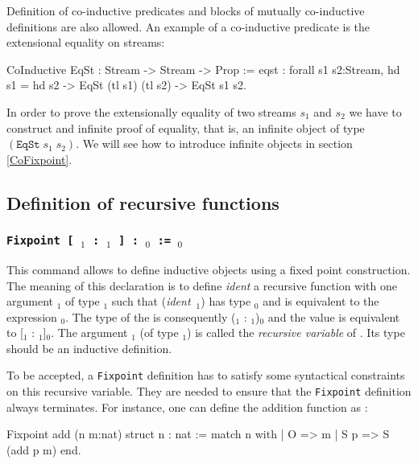 Definition of co-inductive predicates and blocks of mutually
co-inductive definitions are also allowed. An example of a
co-inductive predicate is the extensional equality on streams:

\begin{coq_example}
CoInductive EqSt : Stream -> Stream -> Prop :=
    eqst :
      forall s1 s2:Stream,
        hd s1 = hd s2 -> EqSt (tl s1) (tl s2) -> EqSt s1 s2.
\end{coq_example}

In order to prove the extensionally equality of two streams $s_1$ and
$s_2$ we have to construct and infinite proof of equality, that is,
an infinite object of type $(\texttt{EqSt}\;s_1\;s_2)$. We will see
how to introduce infinite objects in section \ref{CoFixpoint}.

\subsection{Definition of recursive functions}

\subsubsection{\tt Fixpoint {\ident} [ \ident$_1$ : \type$_1$ ] :
\type$_0$ := \term$_0$}
\label{Fixpoint}

This command allows to define inductive objects using a fixed point
construction. The meaning of this declaration is to define {\it
ident} a recursive function with one argument \ident$_1$ of type
\term$_1$ such that ({\it ident}~\ident$_1$) has type \type$_0$ and is
equivalent to the expression \term$_0$. The type of the {\ident} is
consequently {(\ident$_1$ : \type$_1$)\type$_0$} and the value is
equivalent to [\ident$_1$ : \type$_1$]\term$_0$.  The argument
{\ident$_1$} (of type {\type$_1$}) is called the {\em recursive
variable} of {\ident}.  Its type should be an inductive definition.

To be accepted, a {\tt Fixpoint} definition has to satisfy some
syntactical constraints on this recursive variable. They are needed to
ensure that the {\tt Fixpoint} definition always terminates. For
instance, one can define the addition function as :

\begin{coq_example}
Fixpoint add (n m:nat) {struct n} : nat :=
  match n with
  | O => m
  | S p => S (add p m)
  end.
\end{coq_example}

